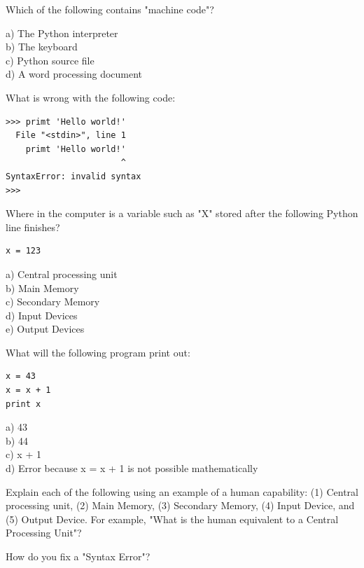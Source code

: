 \begin{ex}
Which of the following contains "machine code"?

a) The Python interpreter\\
b) The keyboard\\
c) Python source file\\
d) A word processing document
\end{ex}

\begin{ex}
What is wrong with the following code:

\beforeverb
\begin{verbatim}
>>> primt 'Hello world!'
  File "<stdin>", line 1
    primt 'Hello world!'
                       ^
SyntaxError: invalid syntax
>>> 
\end{verbatim}
\afterverb

\end{ex}

\begin{ex}
Where in the computer is a variable such as "X" stored 
after the following Python line finishes?

\beforeverb
\begin{verbatim}
x = 123
\end{verbatim}
\afterverb
%
a) Central processing unit\\
b) Main Memory\\
c) Secondary Memory\\
d) Input Devices\\
e) Output Devices
\end{ex}

\begin{ex}
What will the following program print out:

\beforeverb
\begin{verbatim}
x = 43
x = x + 1
print x
\end{verbatim}
\afterverb
%
a) 43\\
b) 44\\
c) x + 1\\
d) Error because x = x + 1 is not possible mathematically
\end{ex}

\begin{ex}
Explain each of the following using an example of a human capability: 
(1) Central processing unit, (2) Main Memory, (3) Secondary Memory, 
(4) Input Device, and
(5) Output Device.
For example, "What is the human equivalent to a Central Processing Unit"? 
\end{ex}

\begin{ex}
How do you fix a "Syntax Error"?
\end{ex}

